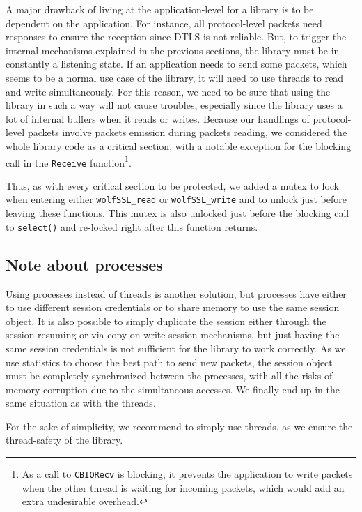 A major drawback of living at the application-level for a library is to be dependent on the application. For instance, all protocol-level packets need responses to ensure the reception since DTLS is not reliable. But, to trigger the internal mechanisms explained in the previous sections, the library must be in constantly a listening state. If an application needs to send some packets, which seems to be a normal use case of the library, it will need to use threads to read and write simultaneously. For this reason, we need to be sure that using the library in such a way will not cause troubles, especially since the library uses a lot of internal buffers when it reads or writes. Because our handlings of protocol-level packets involve packets emission during packets reading, we considered the whole library code as a critical section, with a notable exception for the blocking call in the \texttt{Receive} function\footnote{As a call to \texttt{CBIORecv} is blocking, it prevents the application to write packets when the other thread is waiting for incoming packets, which would add an extra undesirable overhead.}.

Thus, as with every critical section to be protected, we added a mutex to lock when entering either \texttt{wolfSSL\_read} or \texttt{wolfSSL\_write} and to unlock just before leaving these functions. This mutex is also unlocked just before the blocking call to \texttt{select()} and re-locked right after this function returns.

\subsection{Note about processes}

Using processes instead of threads is another solution, but processes have either to use different session credentials or to share memory to use the same session object. It is also possible to simply duplicate the session either through the session resuming or via copy-on-write session mechanisms, but just having the same session credentials is not sufficient for the library to work correctly. As we use statistics to choose the best path to send new packets, the session object must be completely synchronized between the processes, with all the risks of memory corruption due to the simultaneous accesses. We finally end up in the same situation as with the threads.

For the sake of simplicity, we recommend to simply use threads, as we ensure the thread-safety of the library.

